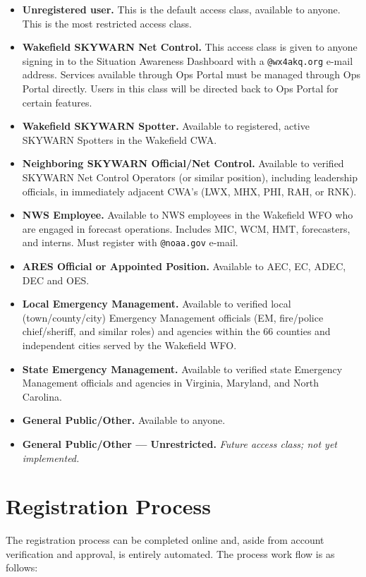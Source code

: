 \documentclass[pdflatex,letterpaper,twoside,12pt]{book}
\begin{document}
\begin{itemize}
\item {\bf Unregistered user.} This is the default access class, available to anyone.  This is the most restricted access class.
\item {\bf Wakefield SKYWARN Net Control.}  This access class is given to anyone signing in to the Situation Awareness Dashboard with a \verb|@wx4akq.org| e-mail address.  Services available through Ops Portal must be managed through Ops Portal directly.  Users in this class will be directed back to Ops Portal for certain features.
\item {\bf Wakefield SKYWARN Spotter.}  Available to registered, active SKYWARN Spotters in the Wakefield CWA.
\item {\bf Neighboring SKYWARN Official/Net Control.}  Available to verified SKYWARN Net Control Operators (or similar position), including leadership officials, in immediately adjacent CWA's (LWX, MHX, PHI, RAH, or RNK).
\item {\bf NWS Employee.}  Available to NWS employees in the Wakefield WFO who are engaged in forecast operations.  Includes MIC, WCM, HMT, forecasters, and interns.  Must register with \verb|@noaa.gov| e-mail.
\item {\bf ARES Official or Appointed Position.}  Available to AEC, EC, ADEC, DEC and OES.
\item {\bf Local Emergency Management.}  Available to verified local (town/county/city) Emergency Management officials (EM, fire/police chief/sheriff, and similar roles) and agencies within the 66 counties and independent cities served by the Wakefield WFO.
\item {\bf State Emergency Management.}  Available to verified state Emergency Management officials and agencies in Virginia, Maryland, and North Carolina.
\item {\bf General Public/Other.}  Available to anyone.
\item {\bf General Public/Other --- Unrestricted.}  \emph{Future access class; not yet implemented.}
\end{itemize}


\section{Registration Process}

The registration process can be completed online and, aside from account verification and approval, is entirely automated.  The process work flow is as follows:
\end{document}
